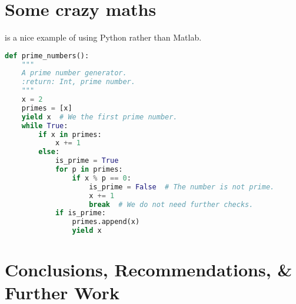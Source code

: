 \documentclass[english,twoside,10pt]{extarticle}
\begin{document}
\section*{Some crazy maths}

 is a nice example of using Python rather than Matlab.
\begin{lstlisting}[language=Python, caption={Some example python code, incase we wanted to show the company some awesome programming idea.}, label={code:example}]
def prime_numbers():
	"""
	A prime number generator.
	:return: Int, prime number.
	"""
	x = 2
	primes = [x]
	yield x  # We the first prime number.
	while True:
		if x in primes:
			x += 1
		else:
			is_prime = True  
			for p in primes:
				if x % p == 0:
					is_prime = False  # The number is not prime.
					x += 1
					break  # We do not need further checks.
			if is_prime:
				primes.append(x)
				yield x
\end{lstlisting}

\blindmathpaper

\section*{Conclusions, Recommendations, \& Further Work}
\begin{myquote}
\lipsum[66]
\end{myquote}

\begin{small}
	\nocite{*} %
	
\end{small}
\clearpage
\end{document}
